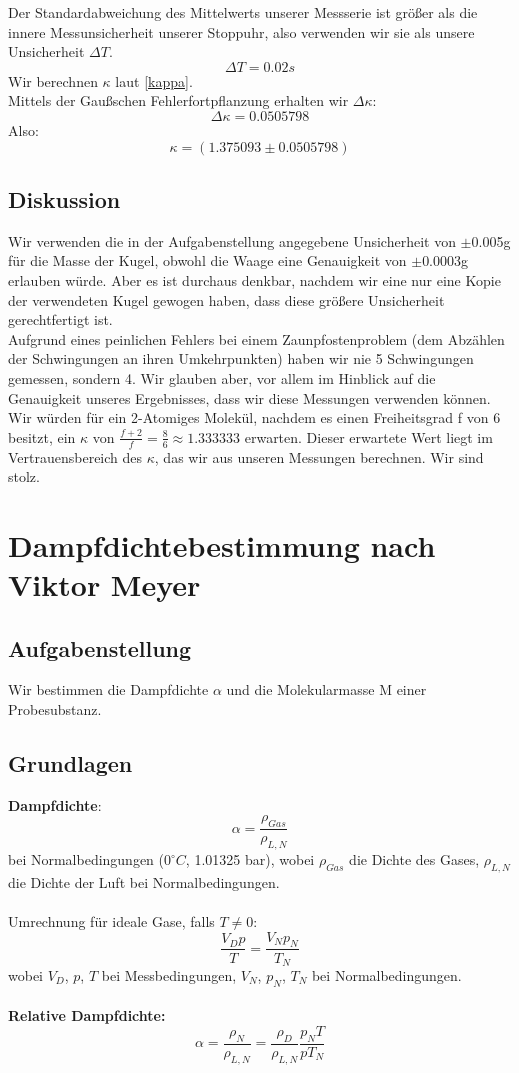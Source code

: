 \documentclass{article}
\begin{document}
Der Standardabweichung des Mittelwerts unserer Messserie ist größer als die innere Messunsicherheit unserer Stoppuhr, also verwenden wir sie als unsere Unsicherheit $\Delta T$.
$$\Delta T=0.02s$$
Wir  berechnen $\kappa$ laut \ref{kappa}. \\
Mittels der Gaußschen Fehlerfortpflanzung erhalten wir $\Delta\kappa$:
$$\Delta\kappa=0.0505798$$
Also:
$$\boxed{\kappa=(1.375093 \pm 0.0505798)} $$

\subsection{Diskussion}
Wir verwenden die in der Aufgabenstellung angegebene Unsicherheit von $\pm$0.005g für die Masse der Kugel, obwohl die Waage eine Genauigkeit von $\pm$0.0003g erlauben würde. Aber es ist durchaus denkbar, nachdem wir eine nur eine Kopie der verwendeten Kugel gewogen haben, dass diese größere Unsicherheit gerechtfertigt ist. \\ 
Aufgrund eines peinlichen Fehlers bei einem Zaunpfostenproblem (dem Abzählen der Schwingungen an ihren Umkehrpunkten) haben wir nie 5 Schwingungen gemessen, sondern 4. Wir glauben aber, vor allem im Hinblick auf die Genauigkeit unseres Ergebnisses, dass wir diese Messungen verwenden können. \\ 
Wir würden für ein 2-Atomiges Molekül, nachdem es einen Freiheitsgrad f von 6 besitzt, ein $\kappa$ von $\frac{f+2}{f}=\frac{8}{6}\approx1.333333$ erwarten. Dieser erwartete Wert liegt im Vertrauensbereich des $\kappa$, das wir aus unseren Messungen berechnen. Wir sind stolz.
\newpage
\section{Dampfdichtebestimmung nach Viktor Meyer}
\subsection{Aufgabenstellung}
Wir bestimmen die Dampfdichte $\alpha$ und die Molekularmasse M einer Probesubstanz. 
\subsection{Grundlagen}
\textbf{Dampfdichte}: 
\begin{equation}
\label{dampfdichte_norm}
\alpha=\frac{\rho_{Gas}}{\rho_{L,N}}
\end{equation}
bei Normalbedingungen ($0^\circ C$, 1.01325 bar), wobei $\rho_{Gas}$ die Dichte des Gases, $\rho_{L,N}$ die Dichte der Luft bei Normalbedingungen.\\
\\
Umrechnung für ideale Gase, falls $T\neq 0$:
\begin{equation}
\frac{V_Dp}{T}=\frac{V_Np_N}{T_N}
\end{equation}
wobei $V_D$, $p$, $T$ bei Messbedingungen, $V_N$, $p_N$, $T_N$ bei Normalbedingungen.\\
\\
\textbf{Relative Dampfdichte:}
\begin{equation}
\label{dampfdichte_rel}
\alpha=\frac{\rho_N}{\rho_{L,N}}=\frac{\rho_D}{\rho_{L,N}}\frac{p_NT}{pT_N}
\end{equation}
\end{document}
